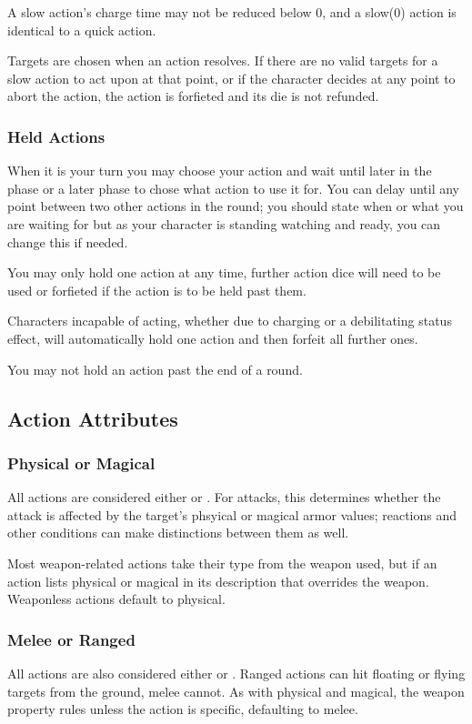 \begin{multicols}{2}
            A slow action's charge time may not be reduced below 0, and a slow(0) action is identical to a quick action.

            Targets are chosen when an action resolves. If there are no valid targets for a slow action to act upon at that point, or if the character decides at any point to abort the action, the action is forfieted and its die is not refunded.

        \subsubsection{Held Actions}
            When it is your turn you may choose  your action and wait until later in the phase or a later phase to chose what action to use it for. You can delay until any point between two other actions in the round; you should state when or what you are waiting for but as your character is standing watching and ready, you can change this if needed.

            You may only hold one action at any time, further action dice will need to be used or forfieted if the action is to be held past them.

            Characters incapable of acting, whether due to charging or a debilitating status effect, will automatically hold one action and then forfeit all further ones.

            You may not hold an action past the end of a round.
                
    \subsection{Action Attributes}
        \subsubsection{Physical or Magical}
            All actions are considered either  or . For attacks, this determines whether the attack is affected by the target's phsyical or magical armor values; reactions and other conditions can make distinctions between them as well.

            Most weapon-related actions take their type from the weapon used, but if an action lists physical or magical in its description that overrides the weapon. Weaponless actions default to physical.
        
        \subsubsection{Melee or Ranged}
            All actions are also considered either  or . Ranged actions can hit floating or flying targets from the ground, melee cannot. As with physical and magical, the weapon property rules unless the action is specific, defaulting to melee.


\end{multicols}
